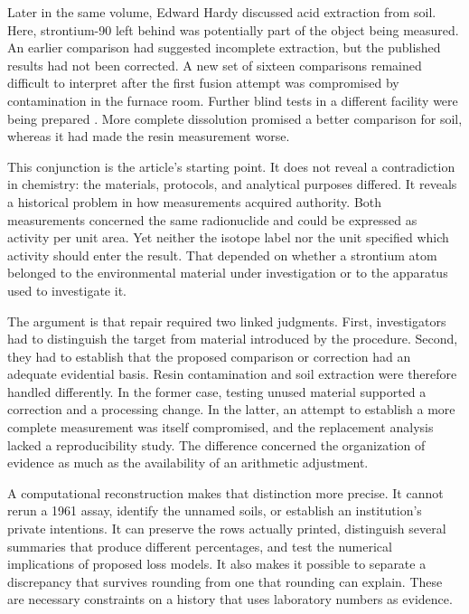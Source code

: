 \documentclass[11pt,a4paper]{article}
\begin{document}
Later in the same volume, Edward Hardy discussed acid extraction from soil. Here, strontium-90 left behind was potentially part of the object being measured. An earlier comparison had suggested incomplete extraction, but the published results had not been corrected. A new set of sixteen comparisons remained difficult to interpret after the first fusion attempt was compromised by contamination in the furnace room. Further blind tests in a different facility were being prepared \citep[pp.~97--100]{hardysoil}. More complete dissolution promised a better comparison for soil, whereas it had made the resin measurement worse.

This conjunction is the article's starting point. It does not reveal a contradiction in chemistry: the materials, protocols, and analytical purposes differed. It reveals a historical problem in how measurements acquired authority. Both measurements concerned the same radionuclide and could be expressed as activity per unit area. Yet neither the isotope label nor the unit specified which activity should enter the result. That depended on whether a strontium atom belonged to the environmental material under investigation or to the apparatus used to investigate it.

The argument is that repair required two linked judgments. First, investigators had to distinguish the target from material introduced by the procedure. Second, they had to establish that the proposed comparison or correction had an adequate evidential basis. Resin contamination and soil extraction were therefore handled differently. In the former case, testing unused material supported a correction and a processing change. In the latter, an attempt to establish a more complete measurement was itself compromised, and the replacement analysis lacked a reproducibility study. The difference concerned the organization of evidence as much as the availability of an arithmetic adjustment.

A computational reconstruction makes that distinction more precise. It cannot rerun a 1961 assay, identify the unnamed soils, or establish an institution's private intentions. It can preserve the rows actually printed, distinguish several summaries that produce different percentages, and test the numerical implications of proposed loss models. It also makes it possible to separate a discrepancy that survives rounding from one that rounding can explain. These are necessary constraints on a history that uses laboratory numbers as evidence.
\end{document}
